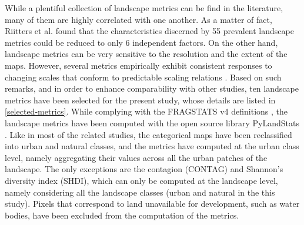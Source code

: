 \documentclass[10pt,letterpaper]{article}
\begin{document}
While a plentiful collection of landscape metrics can be find in the literature, many of them are highly correlated with one another. As a matter of fact, Riitters et al. \cite{riitters1995factor} found that the characteristics discerned by 55 prevalent landscape metrics could be reduced to only 6 independent factors.
On the other hand, landscape metrics can be very sensitive to the resolution and the extent of the maps. However, several metrics empirically exhibit consistent responses to changing scales that conform to predictable scaling relations \cite{wu2002empirical, wu2004effects}.
Based on such remarks, and in order to enhance comparability with other studies, ten landscape metrics have been selected for the present study, whose details are listed in \autoref{selected-metrics}.
While complying with the FRAGSTATS v4 definitions \cite{mcgarigal2012fragstats}, the landscape metrics have been computed with the open source library PyLandStats \cite{bosch2019pylandstats}.
Like in most of the related studies, the categorical maps have been reclassified into urban and natural classes, and the metrics have computed at the urban class level, namely aggregating their values across all the urban patches of the landscape. The only exceptions are the contagion (CONTAG) and Shannon's diversity index (SHDI), which can only be computed at the landscape level, namely considering all the landscape classes (urban and natural in the this study).
Pixels that correspond to land unavailable for development, such as water bodies, have been excluded from the computation of the metrics.
\end{document}
